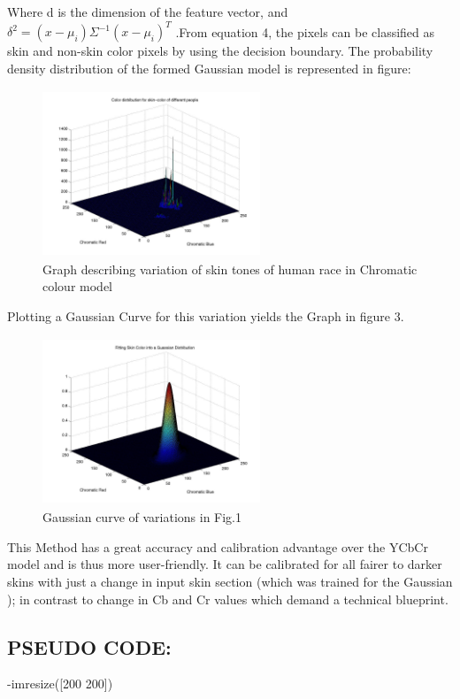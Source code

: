 \documentclass[conference]{IEEEtran}
\begin{document}
Where d is the dimension of the feature vector, and \linebreak
$\delta^2 =(x - \mu_i)\Sigma^{-1}(x - \mu_i)^T $ .From equation 4, the pixels can be classified as skin and non-skin color pixels by using the decision boundary. The probability density distribution of the formed Gaussian model is represented in figure:
\begin{figure}[h!]
	\centering
	\includegraphics[width = 6.5cm, height = 5cm]{skincolor}
	\caption{ Graph describing variation of skin tones of human race in Chromatic colour model}
\end{figure}
Plotting a Gaussian Curve for this variation yields the Graph in figure 3.
\begin{figure}[h!]
	\centering
	\includegraphics[width = 6.5cm, height = 5cm]{gaussian}
	\caption{Gaussian curve of variations in Fig.1}
\end{figure}

This Method has a great accuracy and calibration advantage over the YCbCr model and is thus more user-friendly. It can be calibrated for all fairer to darker skins with just a change in input skin section (which was trained for the Gaussian ); in contrast to change in Cb and Cr values which demand a technical blueprint.

\subsection{PSEUDO CODE:}
-imresize([200 200]) 
\end{document}
